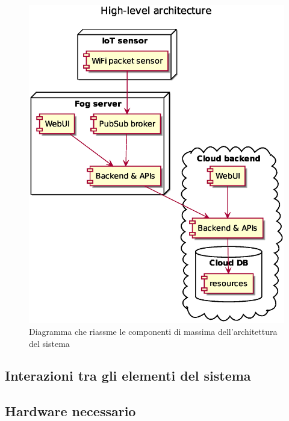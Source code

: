 \begin{figure}[H]
  \centering
  \includegraphics[width=\textwidth]{res/out/architecture.eps}
  \caption{Diagramma che riassme le componenti di massima dell'architettura del sistema}%
  \label{fig:architecture}
\end{figure}

\subsection{Interazioni tra gli elementi del sistema}

\subsection{Hardware necessario}

